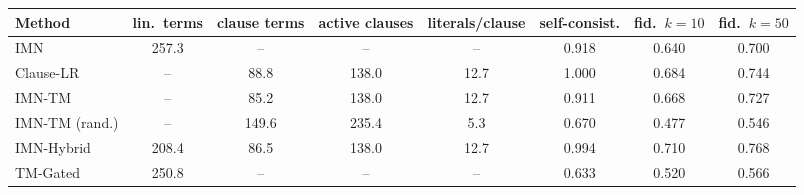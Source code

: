 \begin{tabular}{lccccccc}
\toprule
Method & lin.\ terms & clause terms & active clauses & literals/clause & self-consist. & fid.\ $k{=}10$ & fid.\ $k{=}50$ \\
\midrule
IMN & 257.3 & -- & -- & -- & 0.918 & 0.640 & 0.700 \\
Clause-LR & -- & 88.8 & 138.0 & 12.7 & 1.000 & 0.684 & 0.744 \\
IMN-TM & -- & 85.2 & 138.0 & 12.7 & 0.911 & 0.668 & 0.727 \\
IMN-TM (rand.) & -- & 149.6 & 235.4 & 5.3 & 0.670 & 0.477 & 0.546 \\
IMN-Hybrid & 208.4 & 86.5 & 138.0 & 12.7 & 0.994 & 0.710 & 0.768 \\
TM-Gated & 250.8 & -- & -- & -- & 0.633 & 0.520 & 0.566 \\
\bottomrule
\end{tabular}
